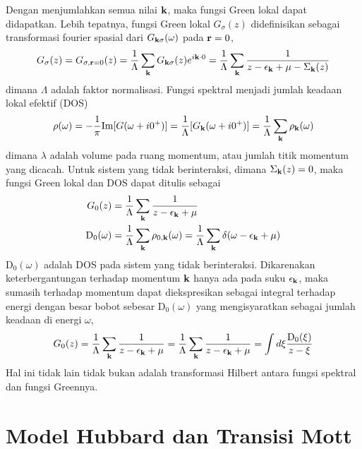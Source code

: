 Dengan menjumlahkan semua nilai $\textbf{k}$, maka fungsi Green lokal dapat didapatkan. Lebih tepatnya, fungsi Green lokal $G_\sigma(z)$ didefinisikan sebagai transformasi fourier spasial dari $G_{\textbf{k}\sigma}(\omega)$ pada $\textbf{r} = 0$,
\begin{align}
G_\sigma(z) = G_{\sigma,\textbf{r} = 0}(z) = \frac{1}{\Lambda} \sum_{\textbf{k}} G_{\textbf{k}\sigma}(z)e^{i\textbf{k}\cdot 0} = \frac{1}{\Lambda}
\sum_{\textbf{k}} \frac{1}{z - \epsilon_{\textbf{k}} + \mu - \Sigma_{\textbf{k}}(z)}
\end{align}
dimana $\Lambda$  adalah faktor normalisasi. Fungsi spektral menjadi jumlah keadaan lokal efektif (DOS)
\begin{align}
\rho(\omega) = -\frac{1}{\pi} \text{Im}[G(\omega + i0^+)] = \frac{1}{\Lambda}[G_{\textbf{k}}(\omega + i0^+)] = \frac{1}{\Lambda}\sum_{\textbf{k}} \rho_{\textbf{k}} (\omega)
\end{align}
dimana $\lambda$ adalah volume pada ruang momentum, atau jumlah titik momentum yang dicacah. Untuk sistem yang tidak berinteraksi, dimana $\Sigma_{\textbf{k}}(z) = 0$, maka fungsi Green lokal dan DOS dapat ditulis sebagai
\begin{align}
G_0(z) &= \frac{1}{\Lambda} \sum_{\textbf{k}} \frac{1}{z - \epsilon_{\textbf{k}} + \mu} \\
\text{D}_0(\omega) &= \frac{1}{\Lambda} \sum_{\textbf{k}} \rho_{0,\textbf{k}}(\omega) = \frac{1}{\Lambda} \sum_{\textbf{k}} \delta(\omega - \epsilon_{\textbf{k}} + \mu )
\end{align}
$\text{D}_0(\omega)$ adalah DOS pada sistem yang tidak berinteraksi. Dikarenakan keterbergantungan terhadap momentum $\textbf{k}$ hanya ada pada suku $\epsilon_{\textbf{k}}$, maka sumasih terhadap momentum dapat diekspresikan sebagai integral terhadap energi dengan besar bobot sebesar $\text{D}_0(\omega)$ yang mengisyaratkan sebagai jumlah keadaan di energi $\omega$,
\begin{align}
G_0(z) = \frac{1}{\Lambda} \sum_{\textbf{k}} \frac{1}{z - \epsilon_{\textbf{k}} + \mu}  = \frac{1}{\Lambda} \sum_{\textbf{k}} \frac{1}{z - \epsilon_{\textbf{k}} + \mu} = \int d\xi \frac{\text{D}_0(\xi)}{z - \xi}
\end{align}
Hal ini tidak lain tidak bukan adalah transformasi Hilbert antara fungsi spektral dan fungsi Greennya.

\section{Model Hubbard dan Transisi Mott}

